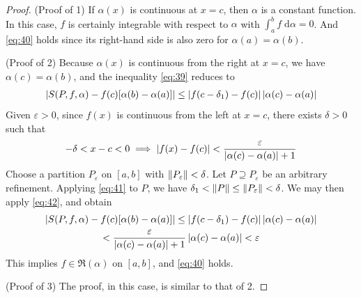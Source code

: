 \documentclass[thmcnt=section, 12pt]{my-elegantbook}
\begin{document}
\begin{proof}
    \par (Proof of 1) If $\alpha(x)$ is continuous at $x=c$, then $\alpha$ is a constant function. In this case, $f$ is certainly integrable with respect to $\alpha$ with $\int_{a}^{b} f \; \mathrm{d}\alpha = 0$. And \eqref{eq:40} holds since its right-hand side is also zero for $\alpha(a) = \alpha(b)$.

    \par (Proof of 2) Because $\alpha(x)$ is continuous from the right at $x=c$, we have $\alpha(c) = \alpha(b)$, and the inequality \eqref{eq:39} reduces to
    \begin{align}
        \left\lvert 
            S(P,f,\alpha)
            - f(c) [\alpha(b) - \alpha(a)]
         \right\rvert
        \leq \left\lvert f(c-\delta_1) - f(c) \right\rvert \left\lvert \alpha(c) - \alpha(a) \right\rvert
        \label{eq:41}
    \end{align}
    Given $\varepsilon > 0$, since $f(x)$ is continuous from the left at $x=c$, there exists $\delta > 0$ such that
    \begin{align}
        -\delta < x - c < 0
        \implies \left\lvert f(x) - f(c) \right\rvert < \frac{\varepsilon}{\left\lvert \alpha(c) - \alpha(a) \right\rvert + 1}
        \label{eq:42}
    \end{align}
    Choose a partition $P_\varepsilon$ on $[a, b]$ with $\left\lVert P_\varepsilon \right\rVert < \delta$. Let $P \supseteq P_\varepsilon$ be an arbitrary refinement. Applying \eqref{eq:41} to $P$, we have $\delta_1 < \left\lVert P \right\rVert \leq \left\lVert P_\varepsilon \right\rVert<\delta$. We may then apply \eqref{eq:42}, and obtain
    \begin{multline*}
        \left\lvert 
            S(P,f,\alpha)
            - f(c) [\alpha(b) - \alpha(a)]
         \right\rvert
        \leq \left\lvert f(c-\delta_1) - f(c) \right\rvert \left\lvert \alpha(c) - \alpha(a) \right\rvert \\
        < \frac{\varepsilon}{\left\lvert \alpha(c) - \alpha(a) \right\rvert + 1} \left\lvert \alpha(c) - \alpha(a) \right\rvert
        < \varepsilon
    \end{multline*}
    This implies $f \in \mathfrak{R}(\alpha)$ on $[a, b]$, and \eqref{eq:40} holds.

    \par (Proof of 3) The proof, in this case, is similar to that of 2.


\end{proof}
\end{document}
